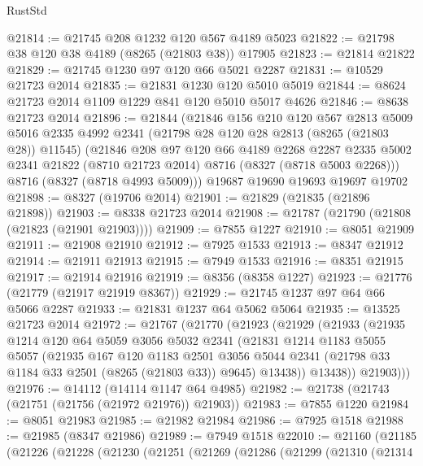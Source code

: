 \begin{lexlean}{RustStd}
\begin{coremodule}
{\begin{coremodule}
{{{{{{{{{{{{{{{{{{{{{{{{{{{{{{{{{{{{{{{{{{{{{{{{{{{{{{@21814 := @21745 @208 @1232 @120 @567 @4189 @5023
@21822 := @21798 @38 @120 @38 @4189 (@8265 (@21803 @38)) @17905
@21823 := @21814 @21822
@21829 := @21745 @1230 @97 @120 @66 @5021 @2287
@21831 := @10529 @21723 @2014
@21835 := @21831 @1230 @120 @5010 @5019
@21844 := @8624 @21723 @2014 @1109 @1229 @841 @120 @5010 @5017 @4626
@21846 := @8638 @21723 @2014
@21896 := @21844
    (@21846
      @156
      @210
      @120
      @567
      @2813
      @5009
      @5016
      @2335
      @4992
      @2341
      (@21798 @28 @120 @28 @2813 (@8265 (@21803 @28)) @11545)
      (@21846
        @208
        @97
        @120
        @66
        @4189
        @2268
        @2287
        @2335
        @5002
        @2341
        @21822
        (@8710 @21723 @2014)
        @8716
        (@8327 (@8718 @5003 @2268)))
      @8716
      (@8327 (@8718 @4993 @5009)))
    @19687
    @19690
    @19693
    @19697
    @19702
@21898 := @8327 (@19706 @2014)
@21901 := @21829 (@21835 (@21896 @21898))
@21903 := @8338 @21723 @2014
@21908 := @21787 (@21790 (@21808 (@21823 (@21901 @21903))))
@21909 := @7855 @1227
@21910 := @8051 @21909
@21911 := @21908 @21910
@21912 := @7925 @1533
@21913 := @8347 @21912
@21914 := @21911 @21913
@21915 := @7949 @1533
@21916 := @8351 @21915
@21917 := @21914 @21916
@21919 := @8356 (@8358 @1227)
@21923 := @21776 (@21779 (@21917 @21919 @8367))
@21929 := @21745 @1237 @97 @64 @66 @5066 @2287
@21933 := @21831 @1237 @64 @5062 @5064
@21935 := @13525 @21723 @2014
@21972 := @21767
    (@21770
      (@21923
        (@21929
          (@21933
            (@21935
              @1214
              @120
              @64
              @5059
              @3056
              @5032
              @2341
              (@21831
                @1214
                @1183
                @5055
                @5057
                (@21935
                  @167
                  @120
                  @1183
                  @2501
                  @3056
                  @5044
                  @2341
                  (@21798 @33 @1184 @33 @2501 (@8265 (@21803 @33)) @9645)
                  @13438))
              @13438))
          @21903)))
@21976 := @14112 (@14114 @1147 @64 @4985)
@21982 := @21738 (@21743 (@21751 (@21756 (@21972 @21976)) @21903))
@21983 := @7855 @1220
@21984 := @8051 @21983
@21985 := @21982 @21984
@21986 := @7925 @1518
@21988 := @21985 (@8347 @21986)
@21989 := @7949 @1518
@22010 := @21160
    (@21185
      (@21226
        (@21228
          (@21230
            (@21251
              (@21269
                (@21286
                  (@21299
                    (@21310
                      (@21314
}}}}}}}}}}}}}}}}}}}}}}}}}}}}}}}}}}}}}}}}}}}}}}}}}}}}}}
\end{coremodule}}
\end{coremodule}
\end{lexlean}
